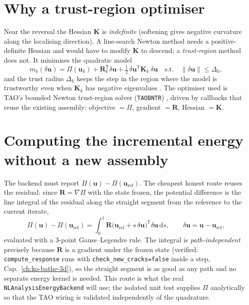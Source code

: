 \section{Why a trust-region optimiser}

Near the reversal the Hessian \(\mathbf{K}\) is \emph{indefinite}
(softening gives negative curvature along the localising direction). A
line-search Newton method needs a positive-definite Hessian and would
have to modify \(\mathbf{K}\) to descend; a \emph{trust-region} method
does not. It minimises the quadratic model
\[
  m_k(\delta\mathbf{u})=\Pi(\mathbf{u}_k)
  +\mathbf{R}_k^{\mathsf T}\delta\mathbf{u}
  +\tfrac12\,\delta\mathbf{u}^{\mathsf T}\mathbf{K}_k\,\delta\mathbf{u}
  \quad\text{s.t.}\quad
  \lVert\delta\mathbf{u}\rVert\le\Delta_k,
\]
and the trust radius \(\Delta_k\) keeps the step in the region where the
model is trustworthy even when \(\mathbf{K}_k\) has negative eigenvalues
\cite{ConnGouldToint2000,NocedalWright2006}. The optimiser used is TAO's
bounded Newton trust-region solver (\texttt{TAOBNTR})
\cite{BalayPETScManual}, driven by callbacks that reuse the existing
assembly: objective \(=\Pi\), gradient \(=\mathbf{R}\), Hessian
\(=\mathbf{K}\).

\section{Computing the incremental energy without a new assembly}

The backend must report \(\Pi(\mathbf{u})-\Pi(\mathbf{u}_\text{ref})\).
The cheapest honest route reuses the residual: since
\(\mathbf{R}=\nabla\Pi\) with the state frozen, the potential difference
is the line integral of the residual along the straight segment from the
reference to the current iterate,
\[
  \Pi(\mathbf{u})-\Pi(\mathbf{u}_\text{ref})
  =\int_0^1
     \mathbf{R}\bigl(\mathbf{u}_\text{ref}+s\,\delta\mathbf{u}\bigr)^{\mathsf T}
     \delta\mathbf{u}\,\mathrm{d}s,
  \qquad
  \delta\mathbf{u}=\mathbf{u}-\mathbf{u}_\text{ref},
\]
evaluated with a 3-point Gauss--Legendre rule. The integral is
\emph{path-independent} precisely because \(\mathbf{R}\) is a gradient
under the frozen state (verified: \texttt{compute\_response} runs with
\texttt{check\_new\_cracks=false} inside a step,
Cap.~\ref{ch:ko-bathe-3d}), so the straight segment is as good as
any path and no separate energy kernel is needed. This route is what the
real \texttt{NLAnalysisEnergyBackend} will use; the isolated unit test
supplies \(\Pi\) analytically so that the TAO wiring is validated
independently of the quadrature.

